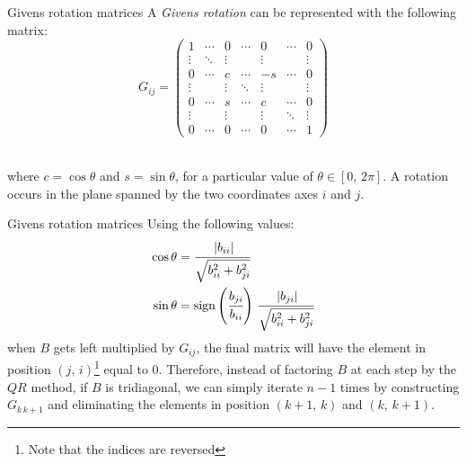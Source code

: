 \documentclass[10pt]{beamer}
\DeclareMathOperator{\sign}{sign}
\begin{document}
\begin{frame}{Givens rotation matrices}
    A \textit{Givens rotation} can be represented with the following matrix:
    $$
    G_{ij} =
    \begin{pmatrix}
        1 & \cdots & 0 & \cdots & 0 & \cdots & 0 \\
        \vdots & \ddots & \vdots & & \vdots & & \vdots \\
        0 & \cdots & c & \cdots & -s & \cdots & 0 \\
        \vdots & & \vdots & \ddots & \vdots & & \vdots \\
        0 & \cdots & s & \cdots & c & \cdots & 0 \\
        \vdots & & \vdots & & \vdots & \ddots & \vdots \\
        0 & \cdots & 0 & \cdots & 0 & \cdots & 1
    \end{pmatrix}
    $$ \\ \bigskip \bigskip

    where $c = \cos \theta$ and  $s = \sin \theta$, for a particular value of $ \theta \in [0, \, 2 \pi] $. \newline
    A rotation occurs in the plane spanned by the two coordinates axes $i$ and $j$.

\end{frame}

\begin{frame}{Givens rotation matrices}
    Using the following values:
    $$
    \begin{aligned}
        \cos \theta &=  \cfrac{\left\lvert b_{ii} \right\rvert}{ \sqrt{ b_{ii}^2 +   b_{ji}^2} } \\
        \sin \theta &= \sign \left( \cfrac{ b_{ji} }{ b_{ii} } \right)   \, \cfrac{\left\lvert b_{ji} \right\rvert}{ \sqrt{ b_{ii}^2 +   b_{ji}^2} } \\
    \end{aligned}
    $$
    when $B$ gets left multiplied by $G_{ij}$, the final matrix will have the element in position $(j, \, i)$\footnote{Note that the indices are reversed} equal to $0$. \newline
    Therefore, instead of factoring $B$ at each step by the $QR$ method, if $B$ is tridiagonal, we can simply iterate $n - 1$ times by constructing $G_{k\,k+1}$ and eliminating the elements in position $(k+1, \, k)$ and $(k, \, k+1)$.
\end{frame}
\end{document}
